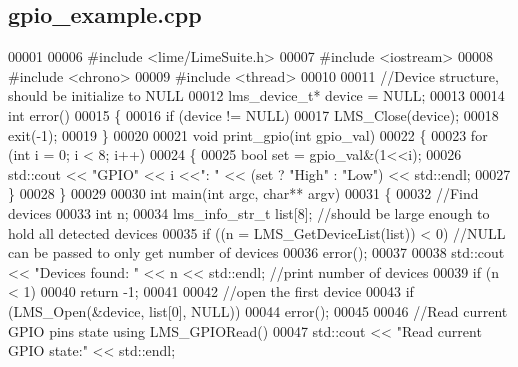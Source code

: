 \subsection{gpio\+\_\+example.\+cpp}
\label{gpio__example_8cpp_source}

\begin{DoxyCode}
00001 
00006 \textcolor{preprocessor}{#include <lime/LimeSuite.h>}
00007 \textcolor{preprocessor}{#include <iostream>}
00008 \textcolor{preprocessor}{#include <chrono>}
00009 \textcolor{preprocessor}{#include <thread>}
00010 
00011 \textcolor{comment}{//Device structure, should be initialize to NULL}
00012 lms_device_t* device = NULL;
00013 
00014 \textcolor{keywordtype}{int} error()
00015 \{
00016     \textcolor{keywordflow}{if} (device != NULL)
00017         LMS_Close(device);
00018     exit(-1);
00019 \}
00020 
00021 \textcolor{keywordtype}{void} print_gpio(\textcolor{keywordtype}{int} gpio\_val)
00022 \{
00023     \textcolor{keywordflow}{for} (\textcolor{keywordtype}{int} i = 0; i < 8; i++)
00024     \{
00025         \textcolor{keywordtype}{bool} \textcolor{keyword}{set} = gpio\_val&(1<<i); 
00026         std::cout << \textcolor{stringliteral}{"GPIO"} << i <<\textcolor{stringliteral}{": "} << (\textcolor{keyword}{set} ? \textcolor{stringliteral}{"High"} : \textcolor{stringliteral}{"Low"}) << std::endl;
00027     \}
00028 \}
00029 
00030 \textcolor{keywordtype}{int} main(\textcolor{keywordtype}{int} argc, \textcolor{keywordtype}{char}** argv)
00031 \{
00032     \textcolor{comment}{//Find devices}
00033     \textcolor{keywordtype}{int} n;
00034     lms_info_str_t list[8]; \textcolor{comment}{//should be large enough to hold all detected devices}
00035     \textcolor{keywordflow}{if} ((n = LMS_GetDeviceList(list)) < 0) \textcolor{comment}{//NULL can be passed to only get number of devices}
00036         error();
00037 
00038     std::cout << \textcolor{stringliteral}{"Devices found: "} << n << std::endl; \textcolor{comment}{//print number of devices}
00039     \textcolor{keywordflow}{if} (n < 1)
00040         \textcolor{keywordflow}{return} -1;
00041 
00042     \textcolor{comment}{//open the first device}
00043     \textcolor{keywordflow}{if} (LMS_Open(&device, list[0], NULL))
00044         error();
00045 
00046     \textcolor{comment}{//Read current GPIO pins state using LMS\_GPIORead()}
00047     std::cout << \textcolor{stringliteral}{"Read current GPIO state:"} << std::endl;

\end{DoxyCode}

